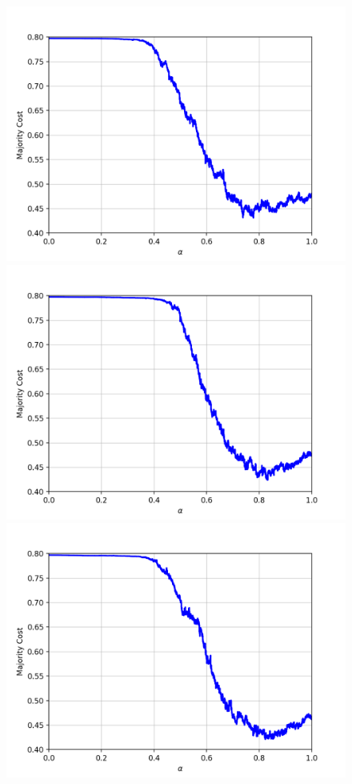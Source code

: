 \begin{figure}[h]
\begin{minipage}{.3\textwidth}
  \includegraphics[width=\linewidth]{plots/mnist-sc-2}
\end{minipage}
\begin{minipage}{.3\textwidth}
  \centering
  \includegraphics[width=\linewidth]{plots/mnist-sc-3}
\end{minipage}
\begin{minipage}{.3\textwidth}
  \centering
  \includegraphics[width=\linewidth]{plots/mnist-sc-4}

\end{minipage}
\end{figure}
